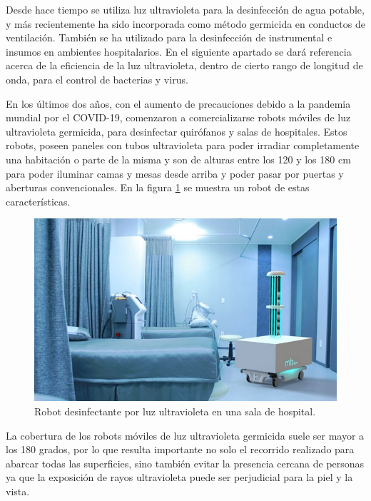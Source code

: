Desde hace tiempo se utiliza luz ultravioleta para la desinfección de agua potable, y más recientemente ha sido incorporada como método germicida en conductos de ventilación. También se ha utilizado para la desinfección de instrumental e insumos en ambientes hospitalarios. En el  siguiente apartado se dará referencia acerca de la eficiencia de la luz ultravioleta, dentro de cierto rango de longitud de onda, para el control de bacterias y virus.

En los últimos dos años, con el aumento de precauciones debido a la pandemia mundial por el COVID-19, comenzaron a comercializarse robots móviles de luz ultravioleta germicida, para desinfectar quirófanos y salas de hospitales\citep{inventos}. 
Estos robots, poseen paneles con tubos ultravioleta para poder irradiar completamente una habitación o parte de la misma y son de alturas entre los 120 y los 180 cm para poder iluminar camas y mesas desde arriba y poder pasar por puertas y aberturas convencionales. En la figura \ref{fig:robotuv} se muestra un robot de estas características.

\begin{figure}[h]
	\centering
	\includegraphics[width=12cm]{./Figures/robothospitalario.PNG}
	\caption{Robot desinfectante por luz ultravioleta en una sala de hospital\protect\footnotemark.}
	\label{fig:robotuv}
\end{figure}

La cobertura de los robots móviles de luz ultravioleta germicida suele ser mayor a los 180 grados, por lo que resulta importante no solo el recorrido realizado para abarcar todas las superficies, sino también evitar la presencia cercana de personas ya que la exposición de rayos ultravioleta puede ser perjudicial para la piel y la vista.  

